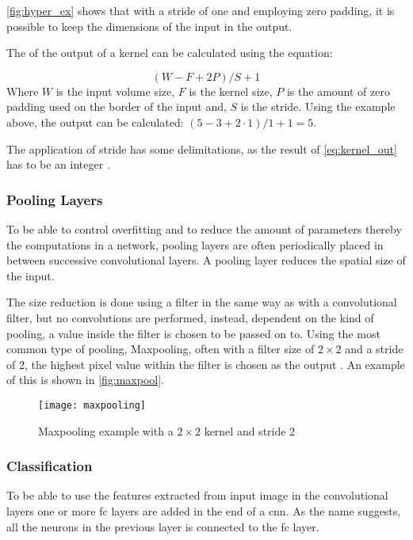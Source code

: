 \autoref{fig:hyper_ex} shows that with a stride of one and employing zero padding, it is possible to keep the dimensions of the input in the output.

The of the output of a kernel can be calculated using the equation:

\begin{equation}\label{eq:kernel_out}
	(W-F+2P)/S+1
\end{equation}
Where $ W $ is the input volume size, $F$ is the kernel size, $P$ is the amount of zero padding used on the border of the input and, $S$ is the stride. Using the example above, the output can be calculated: $(5-3+2\cdot1)/1+1=5$.

The application of stride has some delimitations, as the result of \autoref{eq:kernel_out} has to be an integer \citep{Karpathy2019}.\\

\subsubsection{Pooling Layers}
To be able to control overfitting and to reduce the amount of parameters thereby the computations in a network, pooling layers are often periodically placed in between successive convolutional layers. A pooling layer reduces the spatial size of the input.

The size reduction is done using a filter in the same way as with a convolutional filter, but no convolutions are performed, instead, dependent on the kind of pooling, a value inside the filter is chosen to be passed on to. Using the most common type of pooling, Maxpooling, often with a filter size of $2\times2$ and a stride of 2, the highest pixel value within the filter is chosen as the output \citep{Karpathy2019}. An example of this is shown in \autoref{fig:maxpool}.

\begin{figure}[H]
	\centering
	\texttt{[image: maxpooling]}
	\caption{Maxpooling example with a $2\times2$ kernel and stride 2 \citep{Karpathy2019}}
	\label{fig:maxpool}
\end{figure}

\subsubsection{Classification}
To be able to use the features extracted from input image in the convolutional layers one or more \gls{fc} layers are added in the end of a \gls{cnn}. As the name suggests, all the neurons in the previous layer is connected to the \gls{fc} layer.

